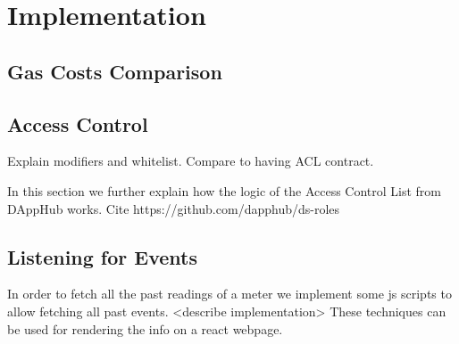 \chapter{Implementation}

\section{Gas Costs Comparison}


\section{Access Control}\label{apx:implementation:acl}
Explain modifiers and whitelist. Compare to having ACL contract.

In this section we further explain how the logic of the Access Control List from DAppHub works. Cite  https://github.com/dapphub/ds-roles

\section{Listening for Events} \label{apx:implementation:events}

In order to fetch all the past readings of a meter we implement some js scripts to allow fetching all past events. <describe implementation>
These techniques can be used for rendering the info on a react webpage.
